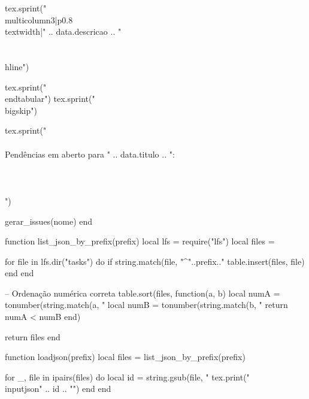 \begin{luacode*}
  tex.sprint("\\multicolumn{3}{|p{0.8\\textwidth}|}{" ..
    data.descricao ..
    "} \\\\ \\hline")

  tex.sprint("\\end{tabular}")
  tex.sprint("\\bigskip")

  tex.sprint("\\\\ Pendências em aberto para " .. data.titulo .. ":\\\\ \\\\")

  gerar_issues(nome)
end

function list_json_by_prefix(prefix)
  local lfs = require("lfs")
  local files = {}

  for file in lfs.dir("tasks") do
    if string.match(file, "^"..prefix.."%
      table.insert(files, file)
    end
  end

  -- Ordenação numérica correta
  table.sort(files, function(a, b)
    local numA = tonumber(string.match(a, "%
    local numB = tonumber(string.match(b, "%
    return numA < numB
  end)

  return files
end

function loadjson(prefix)
  local files = list_json_by_prefix(prefix)

  for _, file in ipairs(files) do
    local id = string.gsub(file, "%
    tex.print("\\inputjson{" .. id .. "}")
  end
end

\end{luacode*}


\newcommand{\inputjson}[1]{\directlua{read_task("#1")}}
\newcommand{\responsaveis}{%
  \directlua{responsaveis()}%
}
\newcommand{\loadjson}[1]{\directlua{loadjson("#1")}}